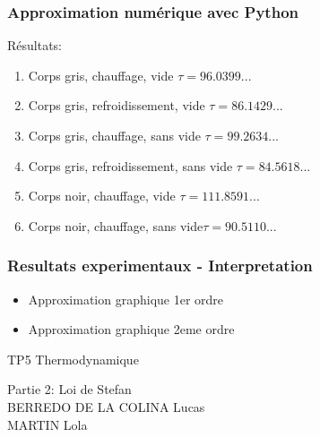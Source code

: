 \documentclass{beamer}
\begin{document}
\begin{frame}
\frametitle{Approximation numérique avec Python}
Résultats:
\begin{enumerate}
	\item{{\color{gray7}Corps gris}{\color{gray4}, {\color{red}chauffage}, vide} \hfill $\tau = 96.0399...$\hspace{4em} \newline}
	\item{{\color{gray7}Corps gris}{\color{gray4}, {\color{blue5}refroidissement}, vide} \hfill $\tau = 86.1429...$\hspace{4em} \newline}
	\item{{\color{gray7}Corps gris}{\color{gray4}, {\color{red}chauffage}, sans vide} \hfill $\tau = 99.2634...$\hspace{4em} \newline}
	\item{{\color{gray7}Corps gris}{\color{gray4}, {\color{blue5}refroidissement}, sans vide} \hfill $\tau = 84.5618...$\hspace{4em} \newline}
	\item{{\color{black}Corps noir}{\color{gray4}, {\color{red}chauffage}, vide} \hfill $\tau = 111.8591...$\hspace{4em} \newline}
	\item{{\color{black}Corps noir}{\color{gray4}, {\color{red}chauffage}, sans vide}\hfill $\tau = 90.5110...$\hspace{4em} \newline}
\end{enumerate}
\end{frame}





\begin{frame}
\frametitle{Resultats experimentaux - Interpretation}

\begin{itemize}
	\item{Approximation graphique 1er ordre}
	\item{Approximation graphique 2eme ordre}

\end{itemize}
\end{frame}





\begin{frame}

\Huge{TP5 Thermodynamique}

\Large{Partie 2: Loi de Stefan}
\\[2em]
\large{BERREDO DE LA COLINA Lucas\\ MARTIN Lola}

\end{frame}
\end{document}
